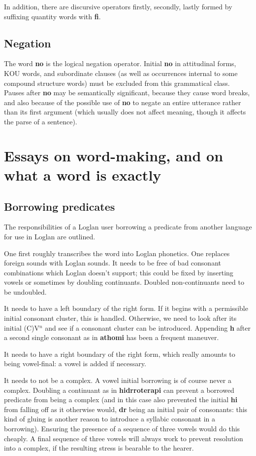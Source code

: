 \documentclass[12pt]{book}
\begin{document}
{In addition, there are discursive operators firstly, secondly, lastly formed by suffixing quantity words with {\bf fi}.

\subsection{Negation}

The word {\bf no} is the logical negation operator.   Initial {\bf no} in attitudinal forms, KOU words, and subordinate clauses (as well as occurrences internal to some compound structure words) must be excluded from this grammatical class.  Pauses after {\bf no} may be semantically significant, because they cause word breaks, and also because of the possible use of {\bf no} to negate an entire utterance rather than its first argument (which usually does not affect meaning, though it affects the parse of a sentence).

\section{Essays on word-making, and on what a word is exactly}

\subsection{Borrowing predicates}

The responsibilities of a Loglan user borrowing a predicate from another language for use in Loglan are outlined.

One first roughly transcribes the word into Loglan phonetics.  One replaces foreign sounds with Loglan sounds.
It needs to be free of bad consonant combinations which Loglan doesn't support; this could be fixed by inserting vowels or sometimes by doubling continuants.   Doubled non-continuants need to be undoubled.

It needs to have a left boundary of the right form.  If it begins with a permissible initial consonant cluster, this is handled.  Otherwise, we need to look after its initial (C)V$^n$ and see if
a consonant cluster can be introduced.  Appending {\bf h} after a  second single consonant as in {\bf athomi} has been a frequent maneuver.

It needs to have a right boundary of the right form, which really amounts to being vowel-final:  a vowel is added if necessary.

It needs to not be a complex.  A vowel initial borrowing is of course never a complex.  Doubling a continuant as in {\bf hidrroterapi} can prevent a borrowed predicate from being a complex (and in this case also prevented the initial {\bf hi} from falling off as it otherwise would, {\bf dr} being an initial pair of consonants:  this kind of gluing is another reason to introduce a syllabic consonant in a borrowing).  Ensuring the presence of a sequence of three vowels would  do this cheaply.  A final sequence of three vowels will always work to prevent resolution into a complex, if the resulting stress is bearable to the hearer.

}
\end{document}
